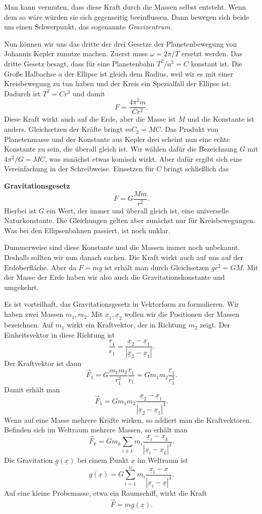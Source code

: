 \documentclass[a4paper,10pt,fleqn,twocolumn,twoside]{scrartcl}
\begin{document}
Man kann vermuten, dass diese Kraft durch die Massen selbst entsteht.
Wenn dem so wäre würden sie sich gegenseitig beeinflussen. Dann
bewegen sich beide um einen Schwerpunkt,
das sogenannte \textit{Gravizentrum}.

Nun können wir uns das dritte der drei Gesetze der Planetenbewegung
von Johannis Kepler zunutze machen. Zuerst muss $\omega=2\pi/T$
ersetzt werden. Das dritte Gesetz besagt, dass für eine
Planetenbahn $T^2/a^3=C$ konstant ist. Die Große Halbachse
$a$ der Ellipse ist gleich dem Radius, weil wir es mit einer
Kreisbewegung zu tun haben und der Kreis ein Spezialfall der
Ellipse ist. Dadurch ist $T^2=Cr^3$ und damit%
\[F = \frac{4\pi^2 m}{Cr^2}.\]
Diese Kraft wirkt auch auf die Erde, aber die Masse ist $M$
und die Konstante ist anders. Gleichsetzen der Kräfte
bringt $mC_2=MC$. Das Produkt von Planetenmasse und der Konstante
aus Kepler drei scheint nun eine echte Konstante zu sein, die überall
gleich ist. Wir wählen dafür
die Bezeichnung $G$ mit $4\pi^2/G=MC$, was zunächst etwas komisch
wirkt. Aber dafür ergibt sich eine Vereinfachung in der Schreibweise.
Einsetzen für $C$ bringt schließlich das

\textbf{Gravitationsgesetz}
\[F = G \frac{Mm}{r^2}.\]
Hierbei ist $G$ ein Wert, der immer und überall gleich ist, eine
universelle Naturkonstante. Die Gleichungen gelten aber zunächst
nur für Kreisbewegungen. Was bei den Ellipsenbahnen passiert,
ist noch unklar.

Dummerweise sind diese Konstante und die Massen immer noch unbekannt.
Deshalb sollten wir nun danach suchen. Die Kraft wirkt auch auf
uns auf der Erdoberfläche. Aber da $F=mg$ ist erhält man durch
Gleichsetzen $gr^2=GM$. Mit der Masse der Erde haben wir also auch
die Gravitationskonstante und umgekehrt.

Es ist vorteilhaft, das Gravitationsgesetz in Vektorform zu
formulieren. Wir haben zwei Massen $m_1, m_2$.
Mit $\underline x_1, \underline x_2$ wollen wir die Positionen
der Massen bezeichnen. Auf $m_1$ wirkt ein Kraftvektor, der in
Richtung $m_2$ zeigt. Der Einheitsvektor in diese Richtung ist%
\[\frac{\underline r_1}{r_1} = \frac{\underline x_2-\underline x_1}
{|\underline x_2-\underline x_1|}.\]
Der Kraftvektor ist dann
\[\vec F_1 = G \frac{m_1m_2}{r_1^2}\frac{\underline r_1}{r_1}
= Gm_1m_2\frac{\underline r_1}{r_1^3}.\]
Damit erhält man
\[\vec F_1 = Gm_1m_2\frac{\underline x_2-\underline x_1}
{|\underline x_2-\underline x_1|^3}.\]
Wenn auf eine Masse mehrere Kräfte wirken, so addiert man die
Kraftvektoren. Befinden sich im Weltraum mehrere Massen,
so erhält man%
\[\vec F_k = Gm_k\sum_{i\ne k}m_i\frac{\underline x_i-\underline x_k}
{|\underline x_i-\underline x_k|^3}.\]
Die Gravitation $\underline g(\underline x)$ bei einem
Punkt $\underline x$ im Weltraum ist%
\[\underline g(\underline x)
= G\sum_{i=1}^n m_i\frac{\underline x_i-\underline x}
{|\underline x_i-\underline x|^3}.\]
Auf eine kleine Probemasse, etwa ein Raumschiff, wirkt die Kraft%
\[\vec F = m\underline g(\underline x).\]
\end{document}

